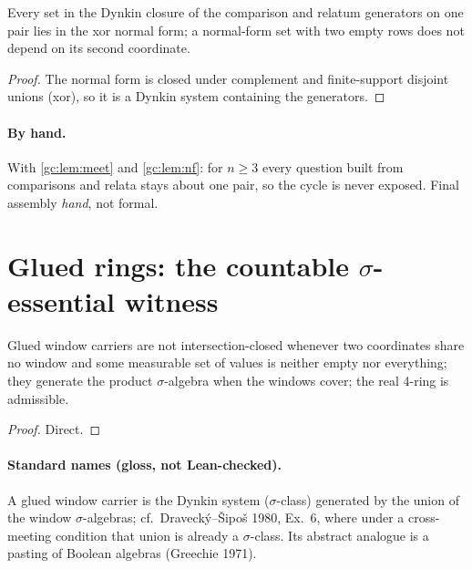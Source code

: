 \begin{lemma}
\label{gc:lem:nf}
\leanok
Every set in the Dynkin closure of the comparison and relatum generators on one
pair lies in the xor normal form; a normal-form set with two empty rows does not
depend on its second coordinate.
\end{lemma}
\begin{proof}
\leanok
The normal form is closed under complement and finite-support disjoint unions
(xor), so it is a Dynkin system containing the generators.
\end{proof}

\paragraph{By hand.} With \ref{gc:lem:meet} and \ref{gc:lem:nf}: for $n\ge3$
every question built from comparisons and relata stays about one pair, so the
cycle is never exposed. Final assembly \emph{hand}, not formal.

\section{Glued rings: the countable $\sigma$-essential witness}

\begin{theorem}
\label{gc:thm:glued}
\leanok
Glued window carriers are not intersection-closed whenever two coordinates share
no window and some measurable set of values is neither empty nor everything; they generate the product $\sigma$-algebra when the windows cover;
the real 4-ring is admissible.
\end{theorem}
\begin{proof}
\leanok
Direct.
\end{proof}

\paragraph{Standard names (gloss, not Lean-checked).} A glued window carrier is
the Dynkin system ($\sigma$-class) generated by the union of the window
$\sigma$-algebras; cf.\ Draveck\'y--\v{S}ipo\v{s} 1980, Ex.~6, where under a
cross-meeting condition that union is already a $\sigma$-class. Its abstract
analogue is a pasting of Boolean algebras (Greechie 1971).

